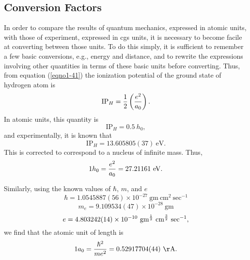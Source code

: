 \subsection{Conversion Factors}

In order to compare the results of quantum mechanics, expressed in
atomic units, with those of experiment, expressed in cgs units, it is
necessary to become facile at converting between those units. To do
this simply, it is sufficient to remember a few basic conversions,
e.g., energy and distance, and to rewrite the expressions involving
other quantities in terms of these basic units before
converting. Thus, from equation (\ref{eqno1-41}) the ionization
potential of the ground state of hydrogen atom is
\begin{equation}
\mathrm{IP}_H = {1 \over 2} \left( {e^2 \over a_0} \right).
\end{equation}
In atomic units, this quantity is
\begin{equation}
\mathrm{IP}_H = 0.5\ h_0 ,
\end{equation}
and experimentally, it is known that
\begin{equation}
\mathrm{IP}_H = 13.605805(37)\ \mathrm{eV}.
\end{equation}
This is corrected to correspond to a nucleus of infinite mass. Thus,
\begin{equation}
1 h_0 = {e^2 \over a_0} = 27.21161\ \mathrm{eV}.
\end{equation}

Similarly, using the known values of $\hbar$, $m$, and $e$
\begin{equation}
\hbar = 1.0545887(56) \times 10^{-27}\ \mathrm{gm}\ \mathrm{cm}^2\
\mathrm{sec}^{-1}
\end{equation}
\begin{equation}
m_e = 9.109534(47) \times 10^{-28}\ \mathrm{gm}
\end{equation}
\begin{equation}
e = 4.803242(14) \times 10^{-10}\ \mathrm{gm}^{{1 \over 2}}\ 
\mathrm{cm}^{{3 \over 2}}\ \mathrm{sec}^{-1},
\end{equation}
we find that the atomic unit of length is
\begin{equation}
1a_0 = {\hbar^2 \over me^2} =  0.52917704(44)\ \mathrm{\AA}.
\end{equation}

